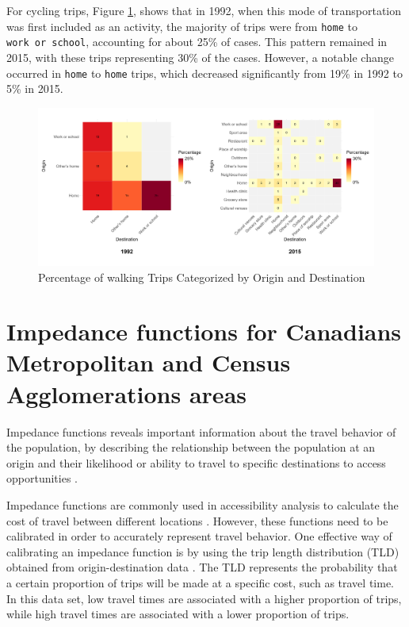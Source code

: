 \documentclass[Royal,times,sageh]{sagej}
\begin{document}
For cycling trips, Figure \ref{fig:figure-02}, shows that in 1992, when
this mode of transportation was first included as an activity, the
majority of trips were from \texttt{home} to \texttt{work\ or\ school},
accounting for about 25\% of cases. This pattern remained in 2015, with
these trips representing 30\% of the cases. However, a notable change
occurred in \texttt{home} to \texttt{home} trips, which decreased
significantly from 19\% in 1992 to 5\% in 2015.

\begin{figure}

{\centering \includegraphics[width=1\linewidth]{Manuscript-figures/cycling_hm_fig} 

}

\caption{Percentage of walking Trips Categorized by Origin and Destination}\label{fig:figure-02}
\end{figure}

\hypertarget{impedance-functions-for-canadians-metropolitan-and-census-agglomerations-areas}{%
\section{Impedance functions for Canadians Metropolitan and Census
Agglomerations
areas}\label{impedance-functions-for-canadians-metropolitan-and-census-agglomerations-areas}}

Impedance functions reveals important information about the travel
behavior of the population, by describing the relationship between the
population at an origin and their likelihood or ability to travel to
specific destinations to access opportunities \citep{soukhov2024}.

Impedance functions are commonly used in accessibility analysis to
calculate the cost of travel between different locations
\citep{hansen1959, páez2012, palacios2022}. However, these functions
need to be calibrated in order to accurately represent travel behavior.
One effective way of calibrating an impedance function is by using the
trip length distribution (TLD) obtained from origin-destination data
\citep{soukhov2024}. The TLD represents the probability that a certain
proportion of trips will be made at a specific cost, such as travel
time. In this data set, low travel times are associated with a higher
proportion of trips, while high travel times are associated with a lower
proportion of trips.
\end{document}
